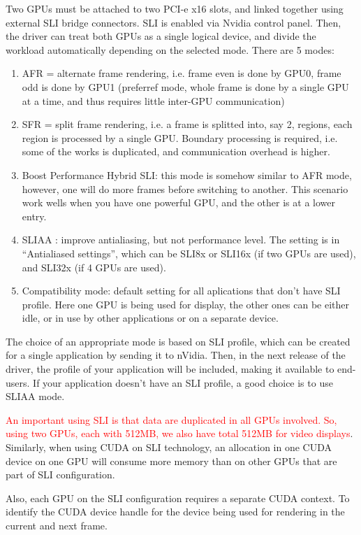 Two GPUs must be attached to two PCI-e x16 slots, and linked together using
external SLI bridge connectors. SLI is enabled via Nvidia control panel. Then,
the driver can treat both GPUs as a single logical device, and divide the
workload automatically depending on the selected mode. There are 5 modes: 
\begin{enumerate}
  \item AFR = alternate frame rendering, i.e. frame even is done by GPU0, frame
  odd is done by GPU1 (preferref mode, whole frame is done by a single GPU at a
  time, and thus requires little inter-GPU communication)
  \item SFR = split frame rendering, i.e. a frame is splitted into, say
  2, regions, each region is processed by a single GPU. Boundary processing is
  required, i.e. some of the works is duplicated, and communication overhead is
  higher. 
  \item Boost Performance Hybrid SLI: this mode is somehow similar to AFR mode,
  however, one will do more frames before switching to another. This scenario
  work wells when you have one powerful GPU, and the other is at a lower entry. 
  \item SLIAA : improve antialiasing, but not performance level. The setting is
  in ``Antialiased settings'', which can be SLI8x or SLI16x (if two GPUs are
  used), and SLI32x (if 4 GPUs are used).
  
  \item Compatibility mode: default setting for all aplications that don't have
  SLI profile. Here one GPU is being used for display, the other ones can be
  either idle, or in use by other applications or on a separate device. 
\end{enumerate}

The choice of an appropriate mode is based on SLI profile, which can be created
for a single application by sending it to nVidia. Then, in the next release of
the driver, the profile of your application will be included, making it
available to end-users. If your application doesn't have an SLI profile, a good
choice is to use SLIAA mode.

\textcolor{red}{An important using SLI is that data are duplicated in all GPUs
involved. So, using two GPUs, each with 512MB, we also have total 512MB for
video displays}. Similarly, when using CUDA on SLI technology, an allocation in
one CUDA device on one GPU will consume more memory than on other GPUs that are
part of SLI configuration. 

Also, each GPU on the SLI configuration requires a separate CUDA context. To
identify the CUDA device handle for the device being used for rendering in the
current and next frame. 




